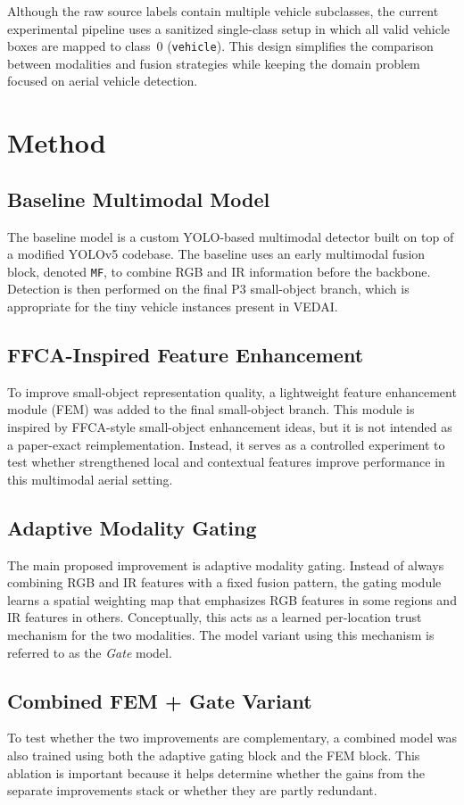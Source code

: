 \documentclass[sigconf,nonacm]{acmart}
\begin{document}
Although the raw source labels contain multiple vehicle subclasses, the current experimental pipeline uses a sanitized single-class setup in which all valid vehicle boxes are mapped to class~0 (\texttt{vehicle}). This design simplifies the comparison between modalities and fusion strategies while keeping the domain problem focused on aerial vehicle detection.

\section{Method}
\subsection{Baseline Multimodal Model}
The baseline model is a custom YOLO-based multimodal detector built on top of a modified YOLOv5 codebase. The baseline uses an early multimodal fusion block, denoted \texttt{MF}, to combine RGB and IR information before the backbone. Detection is then performed on the final P3 small-object branch, which is appropriate for the tiny vehicle instances present in VEDAI.

\subsection{FFCA-Inspired Feature Enhancement}
To improve small-object representation quality, a lightweight feature enhancement module (FEM) was added to the final small-object branch. This module is inspired by FFCA-style small-object enhancement ideas, but it is not intended as a paper-exact reimplementation. Instead, it serves as a controlled experiment to test whether strengthened local and contextual features improve performance in this multimodal aerial setting.

\subsection{Adaptive Modality Gating}
The main proposed improvement is adaptive modality gating. Instead of always combining RGB and IR features with a fixed fusion pattern, the gating module learns a spatial weighting map that emphasizes RGB features in some regions and IR features in others. Conceptually, this acts as a learned per-location trust mechanism for the two modalities. The model variant using this mechanism is referred to as the \emph{Gate} model.

\subsection{Combined FEM + Gate Variant}
To test whether the two improvements are complementary, a combined model was also trained using both the adaptive gating block and the FEM block. This ablation is important because it helps determine whether the gains from the separate improvements stack or whether they are partly redundant.
\end{document}

